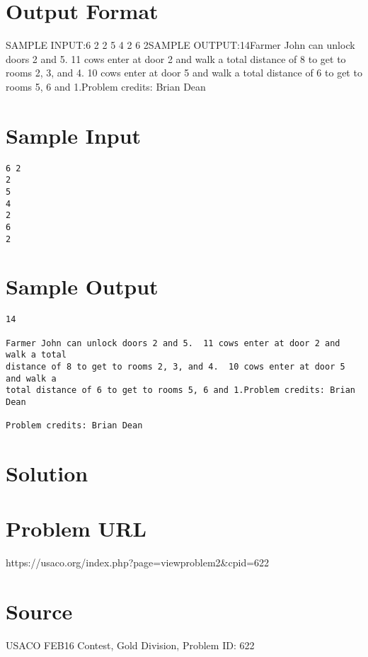 \documentclass[12pt]{article}
\begin{document}
\section*{Output Format}
SAMPLE INPUT:6 2
2
5
4
2
6
2SAMPLE OUTPUT:14Farmer John can unlock doors 2 and 5.  11 cows enter at door 2 and walk a total
distance of 8 to get to rooms 2, 3, and 4.  10 cows enter at door 5 and walk a
total distance of 6 to get to rooms 5, 6 and 1.Problem credits: Brian Dean

\section*{Sample Input}
\begin{verbatim}
6 2
2
5
4
2
6
2
\end{verbatim}

\section*{Sample Output}
\begin{verbatim}
14

Farmer John can unlock doors 2 and 5.  11 cows enter at door 2 and walk a total
distance of 8 to get to rooms 2, 3, and 4.  10 cows enter at door 5 and walk a
total distance of 6 to get to rooms 5, 6 and 1.Problem credits: Brian Dean

Problem credits: Brian Dean
\end{verbatim}

\section*{Solution}


\section*{Problem URL}
https://usaco.org/index.php?page=viewproblem2&cpid=622

\section*{Source}
USACO FEB16 Contest, Gold Division, Problem ID: 622
\end{document}
